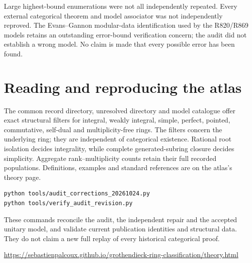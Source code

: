 \documentclass[11pt,a4paper]{article}
\begin{document}
Large highest-bound enumerations were not all independently repeated. Every
external categorical theorem and model associator was not independently
reproved. The Evans--Gannon modular-data identification used by the R820/R869
models retains an outstanding error-bound verification concern; the audit did
not establish a wrong model. No claim is made that every possible error has
been found.

\section{Reading and reproducing the atlas}
The common record directory, unresolved directory and model catalogue offer
exact structural filters for integral, weakly integral, simple, perfect,
pointed, commutative, self-dual and multiplicity-free rings. The filters concern
the underlying ring; they are independent of categorical existence. Rational
root isolation decides integrality, while complete generated-subring closure
decides simplicity. Aggregate rank--multiplicity counts retain their full
recorded populations. Definitions, examples and standard references are on the
atlas's theory page.

\begin{verbatim}
python tools/audit_corrections_20261024.py
python tools/verify_audit_revision.py
\end{verbatim}
These commands reconcile the audit, the independent repair and the accepted unitary model, and validate current
publication identities and structural data. They do not claim a new full
replay of every historical categorical proof.

\url{https://sebastienpalcoux.github.io/grothendieck-ring-classification/theory.html}
\end{document}
